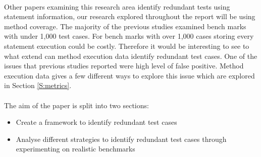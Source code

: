 \paragraph{}
Other papers examining this research area identify redundant tests using statement information, our research explored throughout the report will be using method coverage. The majority of the previous studies examined bench marks with under 1,000 test cases. For bench marks with over 1,000 cases storing every statement execution could be costly. Therefore it would be interesting to see to what extend can method execution data identify redundant test cases. One of the issues that previous studies reported were high level of false positive. Method execution data gives a few different ways to explore this issue which are explored in Section \ref{S:metrics}.
\paragraph{}
The aim of the paper is split into two sections: 

\begin{itemize}
\item Create a framework to identify redundant test cases
\item Analyse different strategies to identify redundant test cases through experimenting on realistic benchmarks
\end{itemize}


